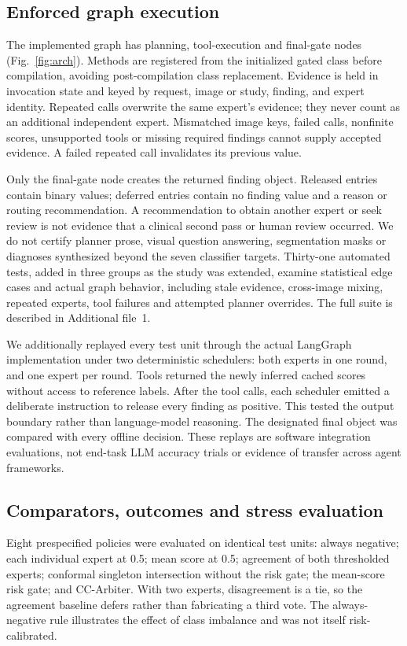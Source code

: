 \documentclass[10pt,a4paper]{article}
\begin{document}
\subsection{Enforced graph execution}
The implemented graph has planning, tool-execution and final-gate nodes (Fig.~\ref{fig:arch}). Methods are registered from the initialized gated class before compilation, avoiding post-compilation class replacement. Evidence is held in invocation state and keyed by request, image or study, finding, and expert identity. Repeated calls overwrite the same expert's evidence; they never count as an additional independent expert. Mismatched image keys, failed calls, nonfinite scores, unsupported tools or missing required findings cannot supply accepted evidence. A failed repeated call invalidates its previous value.

Only the final-gate node creates the returned finding object. Released entries contain binary values; deferred entries contain no finding value and a reason or routing recommendation. A recommendation to obtain another expert or seek review is not evidence that a clinical second pass or human review occurred. We do not certify planner prose, visual question answering, segmentation masks or diagnoses synthesized beyond the seven classifier targets. Thirty-one automated tests, added in three groups as the study was extended, examine statistical edge cases and actual graph behavior, including stale evidence, cross-image mixing, repeated experts, tool failures and attempted planner overrides. The full suite is described in Additional file~1.

We additionally replayed every test unit through the actual LangGraph implementation under two deterministic schedulers: both experts in one round, and one expert per round. Tools returned the newly inferred cached scores without access to reference labels. After the tool calls, each scheduler emitted a deliberate instruction to release every finding as positive. This tested the output boundary rather than language-model reasoning. The designated final object was compared with every offline decision. These replays are software integration evaluations, not end-task LLM accuracy trials or evidence of transfer across agent frameworks.

\subsection{Comparators, outcomes and stress evaluation}
Eight prespecified policies were evaluated on identical test units: always negative; each individual expert at 0.5; mean score at 0.5; agreement of both thresholded experts; conformal singleton intersection without the risk gate; the mean-score risk gate; and CC-Arbiter. With two experts, disagreement is a tie, so the agreement baseline defers rather than fabricating a third vote. The always-negative rule illustrates the effect of class imbalance and was not itself risk-calibrated.
\end{document}
